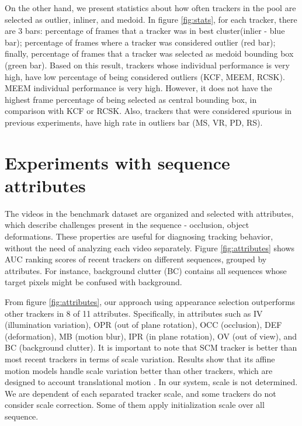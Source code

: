 On the other hand, we present statistics about how often trackers in the pool
are selected as outlier, inliner, and medoid.
In figure
\ref{fig:stats}, for each tracker, there are 3 bars: percentage of frames that a
tracker was in best cluster(inlier - blue bar); percentage of frames where a
tracker was considered outlier (red bar); finally, percentage of frames that a
tracker was selected as medoid bounding box (green bar). Based on this result,
trackers whose individual performance is very high, have low percentage of being
considered outliers (KCF, MEEM, RCSK). MEEM individual performance is very high.
However, it does not have the highest frame percentage of being selected as
central bounding box, in comparison with KCF or RCSK. Also, trackers that were
considered spurious in previous experiments, have high rate in outliers bar
(MS, VR, PD, RS). 

\section{Experiments with sequence attributes}

The videos in the benchmark dataset are organized and selected with attributes,
which describe challenges present in the sequence - \eg occlusion, object
deformations. These properties are useful for diagnosing tracking behavior,
without the need of analyzing each video separately. Figure \ref{fig:attributes}
shows AUC ranking scores of recent trackers on different sequences, grouped by
attributes. For instance, background clutter (BC) contains all sequences whose
target pixels might be confused with background.

From figure \ref{fig:attributes}, our approach using appearance selection
outperforms other trackers in 8 of 11 attributes. Specifically, in attributes
such as IV (illumination variation), OPR (out of plane rotation), OCC
(occlusion), DEF (deformation), MB (motion blur), IPR (in plane rotation),
OV (out of view), and BC (background clutter). It is important to note that SCM
tracker is better than most recent trackers in terms of scale variation.
Results show that its affine motion models handle scale
variation better than other trackers, which are designed to account
translational motion \cite{Wu2013}. In our system, scale is not determined. We are
dependent of each separated tracker scale, and some trackers do not consider
scale correction. Some of them apply initialization scale over all sequence.
